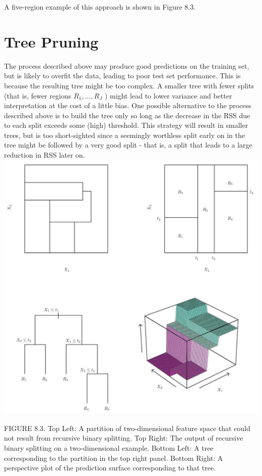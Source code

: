 \documentclass[10pt]{article}
\begin{document}
A five-region example of this approach is shown in Figure 8.3.

\section*{Tree Pruning}
The process described above may produce good predictions on the training set, but is likely to overfit the data, leading to poor test set performance. This is because the resulting tree might be too complex. A smaller tree with fewer splits (that is, fewer regions $R_{1}, \ldots, R_{J}$ ) might lead to lower variance and better interpretation at the cost of a little bias. One possible alternative to the process described above is to build the tree only so long as the decrease in the RSS due to each split exceeds some (high) threshold. This strategy will result in smaller trees, but is too short-sighted since a seemingly worthless split early on in the tree might be followed by a very good split - that is, a split that leads to a large reduction in RSS later on.\\
\includegraphics[max width=\textwidth, center]{2025_05_05_efe77898333945044de4g-323}

FIGURE 8.3. Top Left: A partition of two-dimensional feature space that could not result from recursive binary splitting. Top Right: The output of recursive binary splitting on a two-dimensional example. Bottom Left: A tree corresponding to the partition in the top right panel. Bottom Right: A perspective plot of the prediction surface corresponding to that tree.
\end{document}
